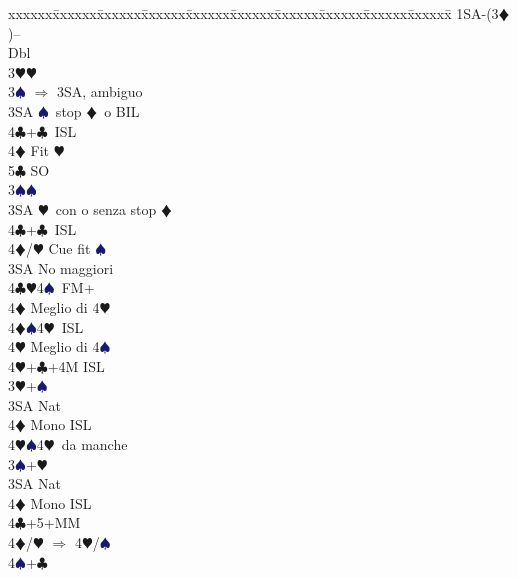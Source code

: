 \documentclass[a4paper,italian]{article}
\newcommand{\BC}{\textcolor{OliveGreen}{$\clubsuit$}}
\newcommand{\BD}{\textcolor{RedOrange}{$\vardiamondsuit$}}
\newcommand{\BH}{\textcolor{Red2}{$\varheartsuit${}}}
\newcommand{\BS}{\textcolor{MidnightBlue}{$\spadesuit${}}}
\newenvironment{bidtable}
{\begin{tabbing}

    xxxxxx\=xxxxxx\=xxxxxx\=xxxxxx\=xxxxxx\=xxxxxx\=xxxxxx\=xxxxxx\=xxxxxx\=xxxxxx\=\kill}
{\end{tabbing} }%
\begin{document}
\begin{multicols}{2}
                                        \begin{bidtable}
                                            1SA-(3\BD)--\+\\
                                            Dbl\+\\
                                            3\BH {}\BH \+\\
                                            3\BS \> $\Rightarrow$ 3SA, ambiguo\\
                                            3SA \BS\ stop \BD\ o BIL\\
                                            4\BC {}+\BC\ ISL\\
                                            4\BD \> Fit \BH \\
                                            5\BC \> SO\-\\
                                            3\BS {}\BS \+\\
                                            3SA \BH\ con o senza stop \BD \\
                                            4\BC {}+\BC\ ISL\\
                                            4\BD/\BH \> Cue fit \BS \-\\
                                            3SA \> No maggiori\+\\
                                            4\BC {}\BH 4\BS\ FM+\+\\
                                            4\BD \> Meglio di 4\BH \-\\
                                            4\BD {}\BS 4\BH\ ISL\+\\
                                            4\BH \> Meglio di 4\BS \-\\
                                            4\BH {}+\BC +4M ISL\-\-\\
                                            3\BH {}+\BS \+\\
                                            3SA \> Nat\+\\
                                            4\BD \> Mono ISL\\
                                            4\BH {}\BS 4\BH\ da manche\-\-\\
                                            3\BS {}+\BH \+\\
                                            3SA \> Nat\+\\
                                            4\BD \> Mono ISL\-\-\\
                                            4\BC {}+5+MM\\
                                            4\BD/\BH \> $\Rightarrow$ 4\BH /\BS \\
                                            4\BS {}+\BC \-
                                        \end{bidtable}


\end{multicols}
\end{document}
